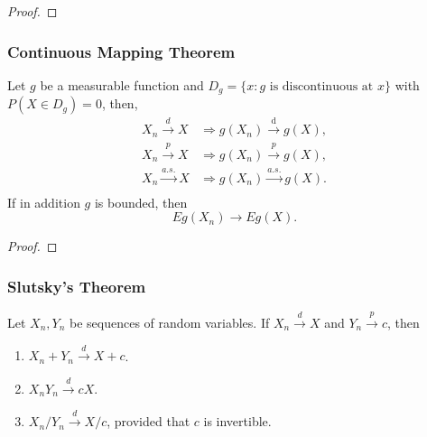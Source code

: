 \begin{proof}

\end{proof}

\subsubsection{Continuous Mapping Theorem}

\begin{theorem} \label{thm:continuous-mapping-theorem}
    Let $g$ be a measurable function and $D_g=\{x:g \text{ is discontinuous at } x\}$ with $P(X\in D_g)=0$, then,
    \begin{equation}
        \begin{aligned}
            X_{n} \stackrel{d}{\rightarrow} X    & \Rightarrow g\left(X_{n}\right) \stackrel{\mathrm{d}}{\rightarrow} g(X), \\
            X_{n} \stackrel{p}{\rightarrow} X    & \Rightarrow g\left(X_{n}\right) \stackrel{p}{\rightarrow} g(X),          \\
            X_{n} \stackrel{a.s.}{\rightarrow} X & \Rightarrow g\left(X_{n}\right) \stackrel{a.s.}{\rightarrow} g(X).       \\
        \end{aligned}
    \end{equation}
    If in addition $g$ is bounded, then
    \begin{equation}
        Eg(X_n)\rightarrow Eg(X).
    \end{equation}
\end{theorem}

\begin{proof}

\end{proof}

\subsubsection{Slutsky's Theorem}

\begin{theorem} \label{thm:slutsky-theorem}
    Let $X_{n}, Y_{n}$ be sequences of random variables. If $X_{n}\stackrel{d}{\rightarrow}X$ and $Y_{n}\stackrel{p}{\rightarrow}c$, then
    \begin{enumerate}
        \item $X_{n}+Y_{n}\stackrel{d}{\rightarrow}X+c$.
        \item $X_{n}Y_{n}\stackrel{d}{\rightarrow}cX$.
        \item $X_{n}/Y_{n}\stackrel{d}{\rightarrow}X/c$, provided that $c$ is invertible.
    \end{enumerate}
\end{theorem}

